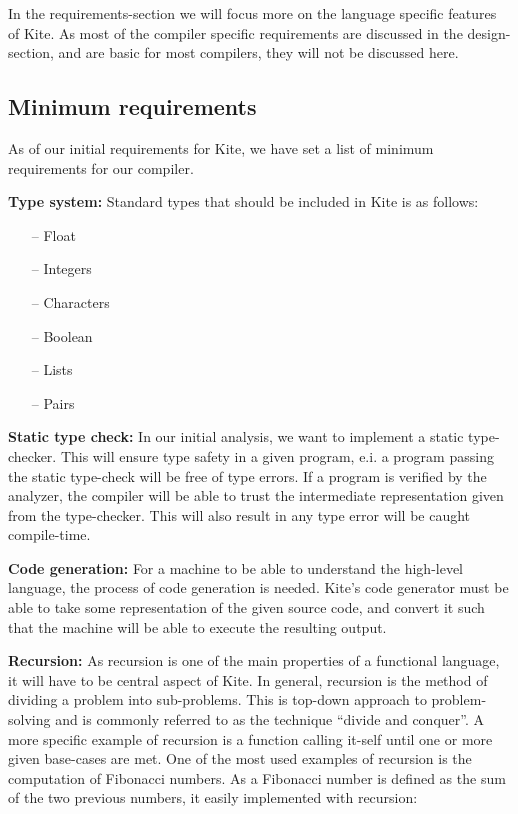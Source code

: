 In the requirements-section we will focus more on the language specific features of Kite. As most of the compiler specific requirements are discussed in the design-section, and are basic for most compilers, they will not be discussed here.

\subsection{Minimum requirements}
As of our initial requirements for Kite, we have set a list of minimum requirements for our compiler.

\textbf{Type system:} Standard types that should be included in Kite is as follows:
\begin{itemize}
\item [--] Float
\item [--] Integers
\item [--] Characters
\item [--] Boolean
\item [--] Lists
\item [--] Pairs
\end{itemize}

\textbf{Static type check:}
In our initial analysis, we want to implement a static type-checker. This will ensure type safety in a given program, e.i. a program passing the static type-check will be free of type errors. If a program is verified by the analyzer, the compiler will be able to trust the intermediate representation given from the type-checker. This will also result in any type error will be caught compile-time.

\textbf{Code generation:}
For a machine to be able to understand the high-level language, the process of code generation is needed. Kite's code generator must be able to take some representation of the given source code, and convert it such that the machine will be able to execute the resulting output.

\textbf{Recursion:}
As recursion is one of the main properties of a functional language, it will have to be central aspect of Kite. In general, recursion is the method of dividing a problem into sub-problems. This is top-down approach to problem-solving and is commonly referred to as the technique ``divide and conquer''. A more specific example of recursion is a function calling it-self until one or more given base-cases are met. One of the most used examples of recursion is the computation of Fibonacci numbers. As a Fibonacci number is defined as the sum of the two previous numbers, it easily implemented with recursion:

